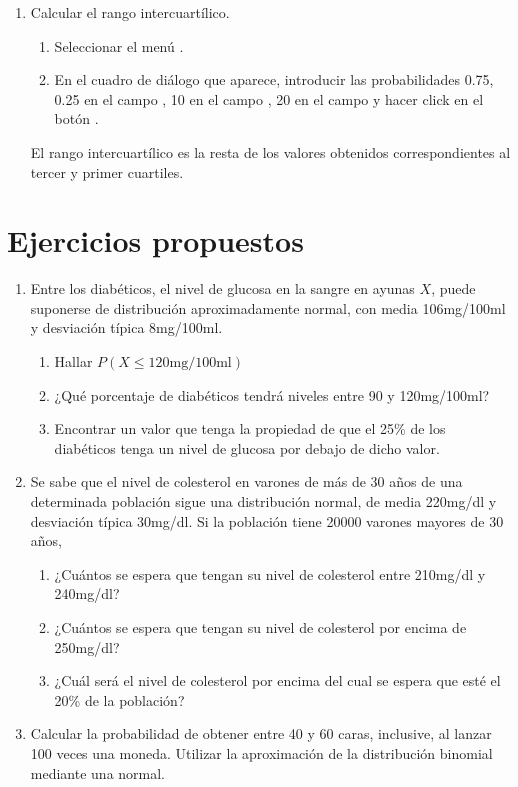 \begin{enumerate}[leftmargin=*]
\begin{enumerate}
\item Calcular el rango intercuartílico.
\begin{indicacion}{
\begin{enumerate}
\item Seleccionar el menú .
\item En el cuadro de diálogo que aparece, introducir las probabilidades 0.75, 0.25 en el campo ,
10 en el campo , 20  en el campo  y
hacer click en el botón .
\end{enumerate}
El rango intercuartílico es la resta de los valores obtenidos correspondientes al tercer y primer cuartiles.
}
\end{indicacion}
\end{enumerate}

\end{enumerate}


\section{Ejercicios propuestos}
\begin{enumerate}[leftmargin=*]
\item Entre los diabéticos, el nivel de glucosa en la sangre en ayunas $X$, puede suponerse de distribución
aproximadamente normal, con media 106mg/100ml y desviación típica 8mg/100ml.
\begin{enumerate}
\item Hallar $P(X\leq120\textrm{mg}/100\textrm{ml})$
\item ¿Qué porcentaje de diabéticos tendrá niveles entre 90 y 120mg/100ml?
\item Encontrar un valor que tenga la propiedad de que el 25\% de los diabéticos tenga un nivel de glucosa por debajo de
dicho valor.
\end{enumerate}

\item Se sabe que el nivel de colesterol en varones de más de 30 años de una determinada población sigue una
distribución normal, de media 220mg/dl y desviación típica 30mg/dl.
Si la población tiene 20000 varones mayores de 30 años,
\begin{enumerate}
\item ¿Cuántos se espera que tengan su nivel de colesterol entre 210mg/dl y 240mg/dl?
\item ¿Cuántos se espera que tengan su nivel de colesterol por encima de 250mg/dl?
\item ¿Cuál será el nivel de colesterol por encima del cual se espera que esté el 20\% de la población?
\end{enumerate}

\item Calcular la probabilidad de obtener entre 40 y 60 caras, inclusive, al lanzar 100 veces una moneda. 
Utilizar la aproximación de la distribución binomial mediante una normal.
\end{enumerate}
